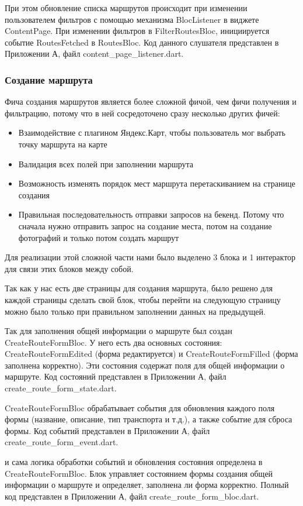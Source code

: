 При этом обновление списка маршрутов происходит при изменении пользователем фильтров с помощью механизма BlocListener в виджете ContentPage. При изменении фильтров в FilterRoutesBloc, инициируется событие RoutesFetched в RoutesBloc. Код данного слушателя представлен в Приложении А, файл content\_page\_listener.dart.

\subsubsection*{Создание маршрута}
Фича создания маршрутов является более сложной фичой, чем фичи получения и фильтрацию, потому что в ней сосредоточено сразу несколько других фичей:

\begin{itemize}
    \item Взаимодействие с плагином Яндекс.Карт, чтобы пользователь мог выбрать точку маршрута на карте
    \item Валидация всех полей при заполнении маршрута
    \item Возможность изменять порядок мест маршрута перетаскиванием на странице создания
    \item Правильная последовательность отправки запросов на бекенд. Потому что сначала нужно отправить запрос на создание места, потом на создание фотографий и только потом создать маршрут
\end{itemize}

\noindent Для реализации этой сложной части нами было выделено 3 блока и 1 интерактор для связи этих блоков между собой.

Так как у нас есть две страницы для создания маршрута, было решено для каждой страницы сделать свой блок, чтобы перейти на следующую страницу можно было только при правильном заполнении данных на предыдущей. 

Так для  заполнения общей информации о маршруте был создан CreateRouteFormBloc. У него есть два основных состояния: CreateRouteFormEdited (форма редактируется) и CreateRouteFormFilled (форма заполнена корректно). Эти состояния содержат поля для общей информации о маршруте. Код состояний представлен в Приложении А, файл create\_route\_form\_state.dart.

CreateRouteFormBloc обрабатывает события для обновления каждого поля формы (название, описание, тип транспорта и т.д.), а также событие для сброса формы. Код событий представлен в Приложении А, файл create\_route\_form\_event.dart.

и сама логика обработки событий и обновления состояния определена в CreateRouteFormBloc. Блок управляет состоянием формы создания общей информации о маршруте и определяет, заполнена ли форма корректно. Полный код представлен в Приложении А, файл create\_route\_form\_bloc.dart.

